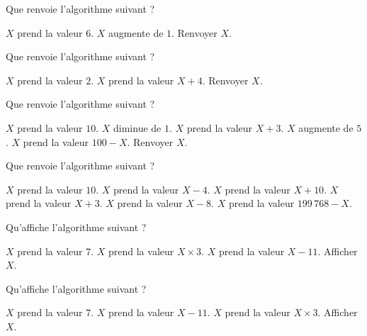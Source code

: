 \begin{multicols}{2}
    \algoname{}
    Que renvoie l'algorithme suivant ?
    \bigskip
    \begin{myverb}
\(X\) prend la valeur \(6\).
\(X\) augmente de \(1\).
Renvoyer \(X\).
    \end{myverb}

    \switchcol

    \algoname{}
    Que renvoie l'algorithme suivant ?
    \bigskip
    \begin{myverb}
\(X\) prend la valeur \(2\).
\(X\) prend la valeur \(X+4\).
Renvoyer \(X\).
    \end{myverb}
\end{multicols}

\algorule

\begin{multicols}{2}
    \algoname{}
    Que renvoie l'algorithme suivant ?
    \bigskip
    \begin{myverb}
\(X\) prend la valeur \(10\).
\(X\) diminue de \(1\).
\(X\) prend la valeur \(X+3\).
\(X\) augmente de \(5\).
\(X\) prend la valeur \(100-X\).
Renvoyer \(X\).
    \end{myverb}

    \switchcol

    \algoname{}
    Que renvoie l'algorithme suivant ?
    \bigskip
    \begin{myverb}
\(X\) prend la valeur \(10\).
\(X\) prend la valeur \(X-4\).
\(X\) prend la valeur \(X+10\).
\(X\) prend la valeur \(X+3\).
\(X\) prend la valeur \(X-8\).
\(X\) prend la valeur \(199\,768-X\).
    \end{myverb}
\end{multicols}

\algorule

\begin{multicols}{2}
    \algoname{}
    Qu'affiche l'algorithme suivant ?
    \bigskip
    \begin{myverb}
\(X\) prend la valeur \(7\).
\(X\) prend la valeur \(X\times3\).
\(X\) prend la valeur \(X-11\).
Afficher \(X\).
    \end{myverb}

    \switchcol

    \algoname{}
    Qu'affiche l'algorithme suivant ?
    \bigskip
    \begin{myverb}
\(X\) prend la valeur \(7\).
\(X\) prend la valeur \(X-11\).
\(X\) prend la valeur \(X\times3\).
Afficher \(X\).
    \end{myverb}
\end{multicols}

